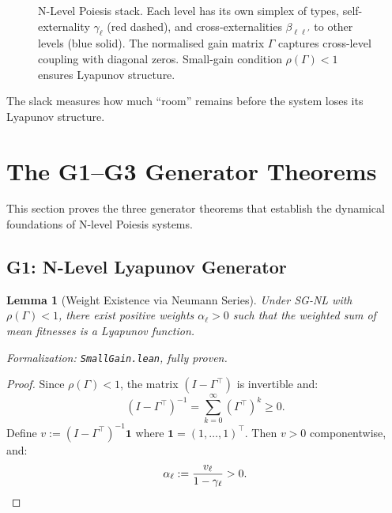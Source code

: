 \documentclass[12pt]{article}
\newtheorem{lemma}[theorem]{Lemma}
\begin{document}
\begin{figure}[h]
\caption{N-Level Poiesis stack. Each level has its own simplex of types, self-externality $\gamma_\ell$ (red dashed), and cross-externalities $\beta_{\ell\ell'}$ to other levels (blue solid). The normalised gain matrix $\Gamma$ captures cross-level coupling with diagonal zeros. Small-gain condition $\rho(\Gamma) < 1$ ensures Lyapunov structure.}
\label{fig:n-level-stack}
\end{figure}

The slack measures how much ``room'' remains before the system loses its Lyapunov structure.


\section{The G1--G3 Generator Theorems}
\label{sec:g1-g3}

This section proves the three generator theorems that establish the dynamical foundations of N-level Poiesis systems.

\subsection{G1: N-Level Lyapunov Generator}

\begin{lemma}[Weight Existence via Neumann Series]
\label{lem:weight-existence}
Under SG-NL with $\rho(\Gamma) < 1$, there exist positive weights $\alpha_\ell > 0$ such that the weighted sum of mean fitnesses is a Lyapunov function.
\end{lemma}
\noindent\textit{Formalization: \texttt{SmallGain.lean}, fully proven.}

\begin{proof}
Since $\rho(\Gamma) < 1$, the matrix $(I - \Gamma^\top)$ is invertible and:
\[
(I - \Gamma^\top)^{-1} = \sum_{k=0}^\infty (\Gamma^\top)^k \geq 0.
\]
Define $v := (I - \Gamma^\top)^{-1} \mathbf{1}$ where $\mathbf{1} = (1, \ldots, 1)^\top$. Then $v > 0$ componentwise, and:
\[
\alpha_\ell := \frac{v_\ell}{1 - \gamma_\ell} > 0. \qedhere
\]
\end{proof}
\end{document}
